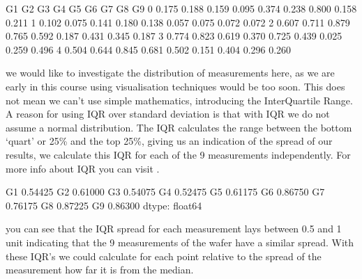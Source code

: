 \documentclass[letterpaper,10pt,english]{jupyterBook}
\begin{document}
\begin{sphinxVerbatim}[commandchars=\\\{\}]
      G1     G2     G3     G4     G5     G6     G7     G8     G9
0  0.175  0.188 \PYGZhy{}0.159  0.095  0.374 \PYGZhy{}0.238 \PYGZhy{}0.800  0.158 \PYGZhy{}0.211
1  0.102  0.075  0.141  0.180  0.138 \PYGZhy{}0.057 \PYGZhy{}0.075  0.072  0.072
2  0.607  0.711  0.879  0.765  0.592  0.187  0.431  0.345  0.187
3  0.774  0.823  0.619  0.370  0.725  0.439 \PYGZhy{}0.025 \PYGZhy{}0.259  0.496
4  0.504  0.644  0.845  0.681  0.502  0.151  0.404  0.296  0.260
\end{sphinxVerbatim}

\sphinxAtStartPar
we would like to investigate the distribution of measurements here, as we are early in this course using visualisation techniques would be too soon.
This does not mean we can’t use simple mathematics, introducing the InterQuartile Range.
A reason for using IQR over standard deviation is that with IQR we do not assume a normal distribution.
The IQR calculates the range between the bottom ‘quart’ or 25\% and the top 25\%, giving us an indication of the spread of our results, we calculate this IQR for each of the 9 measurements independently.
For more info about IQR you can visit .

\begin{sphinxVerbatim}[commandchars=\\\{\}]
  
\end{sphinxVerbatim}

\begin{sphinxVerbatim}[commandchars=\\\{\}]
G1    0.54425
G2    0.61000
G3    0.54075
G4    0.52475
G5    0.61175
G6    0.86750
G7    0.76175
G8    0.87225
G9    0.86300
dtype: float64
\end{sphinxVerbatim}

\sphinxAtStartPar
you can see that the IQR spread for each measurement lays between 0.5 and 1 unit indicating that the 9 measurements of the wafer have a similar spread.
With these IQR’s we could calculate for each point relative to the spread of the measurement how far it is from the median.

\begin{sphinxVerbatim}[commandchars=\\\{\}]
  
\end{sphinxVerbatim}
\end{document}
